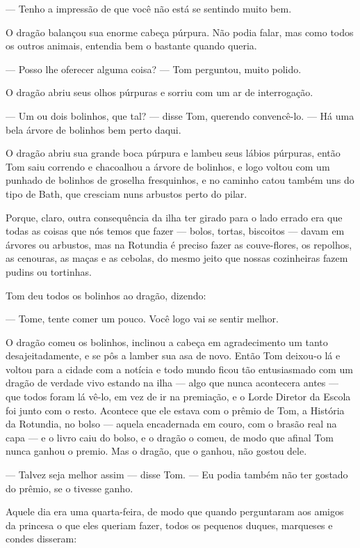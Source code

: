 — Tenho a impressão de que você não está se sentindo muito bem.

O dragão balançou sua enorme cabeça púrpura. Não podia falar, mas como
todos os outros animais, entendia bem o bastante quando queria.

— Posso lhe oferecer alguma coisa? — Tom perguntou, muito polido.

O dragão abriu seus olhos púrpuras e sorriu com um ar de interrogação.

— Um ou dois bolinhos, que tal? — disse Tom, querendo convencê-lo. —
Há uma bela árvore de bolinhos bem perto daqui.

O dragão abriu sua grande boca púrpura e lambeu seus lábios púrpuras,
então Tom saiu correndo e chacoalhou a árvore de bolinhos, e logo
voltou com um punhado de bolinhos de groselha fresquinhos, e no
caminho catou também uns do tipo de Bath, que cresciam nuns arbustos
perto do pilar.

Porque, claro, outra consequência da ilha ter girado para o lado
errado era que todas as coisas que nós temos que fazer — bolos,
tortas, biscoitos — davam em árvores ou arbustos, mas na Rotundia é
preciso fazer as couve-flores, os repolhos, as cenouras, as maças e
as cebolas, do mesmo jeito que nossas cozinheiras fazem pudins ou
tortinhas. 

Tom deu todos os bolinhos ao dragão, dizendo:

— Tome, tente comer um pouco. Você logo vai se sentir melhor.

O dragão comeu os bolinhos, inclinou a cabeça em agradecimento um
tanto desajeitadamente, e se pôs a lamber sua asa de novo. Então Tom
deixou-o lá e voltou para a cidade com a notícia e todo mundo ficou
tão entusiasmado com um dragão de verdade vivo estando na ilha — algo
que nunca acontecera antes — que todos foram lá vê-lo, em vez de ir
na premiação, e o Lorde Diretor da Escola foi junto com o resto.
Acontece que ele estava com o prêmio de Tom, a História da Rotundia,
no bolso — aquela encadernada em couro, com o brasão real na capa — e
o livro caiu do bolso, e o dragão o comeu, de modo que afinal Tom
nunca ganhou o premio. Mas o dragão, que o ganhou, não gostou dele.

— Talvez seja melhor assim — disse Tom. — Eu podia também não ter
gostado do prêmio, se o tivesse ganho.

Aquele dia era uma quarta-feira, de modo que quando perguntaram aos
amigos da princesa o que eles queriam fazer, todos os pequenos
duques, marqueses e condes disseram:


